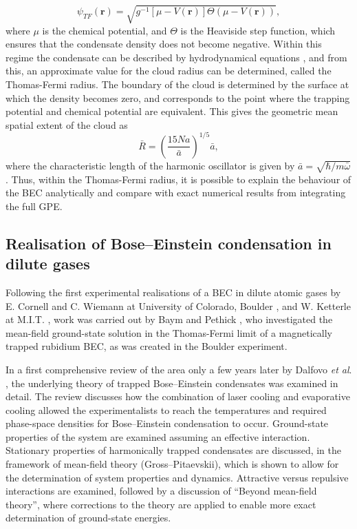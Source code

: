 \begin{equation}
\psi_{TF}(\textbf{r}) = \sqrt{ g^{-1}[\mu - V(\textbf{r})] \Theta(\mu - V(\textbf{r}))},
\end{equation}
where $\mu$ is the chemical potential, and $\Theta$ is the Heaviside step function, which ensures that the condensate density does not become negative. Within this regime the condensate can be described by hydrodynamical equations \cite[Pg.~180]{BK:Pitaevskii_Stringari_2003}, and from this, an approximate value for the cloud radius can be determined, called the Thomas-Fermi radius. The boundary of the cloud is determined by the surface at which the density becomes zero, and corresponds to the point where the trapping potential and chemical potential are equivalent. This gives the geometric mean spatial extent of the cloud \cite[~p. 169]{BK:Pethick_Smith_2008} as
\begin{equation}
\bar{R} = \left(\frac{15Na}{\bar{a}}\right)^{1/5}\bar{a},
\end{equation}
where the characteristic length of the harmonic oscillator is given by
$\bar{a} = \sqrt{{\hbar}/{m\bar{\omega}}}$. Thus, within the Thomas-Fermi radius, it is possible to explain the behaviour of the BEC analytically and compare with exact numerical results from integrating the full GPE.

\subsection{Realisation of Bose--Einstein condensation in dilute gases}\label{sub:becdev}
Following the first experimental realisations of a BEC in dilute atomic gases by E. Cornell and C. Wiemann at University of Colorado, Boulder \cite{BEC:Cornell_science_1995}, and W. Ketterle at M.I.T. \cite{BEC:Ketterle_prl_1995}, work was carried out by Baym and Pethick \cite{BEC:Baym_prl_1996}, who investigated the mean-field ground-state solution in the Thomas-Fermi limit of a magnetically trapped rubidium BEC, as was created in the Boulder experiment.

In a first comprehensive review of the area only a few years later by Dalfovo \textit{et al}. \cite{BEC:Dalfovo_revmod_1999}, the underlying theory of trapped Bose--Einstein condensates was examined in detail. The review discusses how the combination of laser cooling and evaporative cooling \cite{AO:Ketterle_amop_1996} allowed the experimentalists to reach the temperatures and required phase-space densities for Bose--Einstein condensation to occur. Ground-state properties of the system are examined assuming an effective interaction. Stationary properties of harmonically trapped condensates are discussed, in the framework of mean-field theory (Gross--Pitaevskii), which is shown to allow for the determination of system properties and dynamics. Attractive versus repulsive interactions are examined, followed by a discussion of ``Beyond mean-field theory'', where corrections to the theory are applied to enable more exact determination of ground-state energies.

